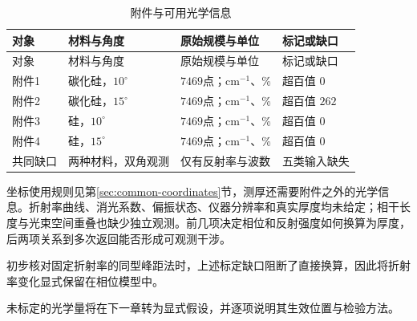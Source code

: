 \begin{longtable}{>{\centering\arraybackslash}p{} >{\centering\arraybackslash}p{} >{\centering\arraybackslash}p{} >{\centering\arraybackslash}p{}}
\caption{附件与可用光学信息}\label{tab:available-info}\\
\hline
对象 & 材料与角度 & 原始规模与单位 & 标记或缺口\\
\hline
\endfirsthead
\hline
对象 & 材料与角度 & 原始规模与单位 & 标记或缺口\\
\hline
\endhead
附件1 & 碳化硅，$10^\circ$ & $7469$点；\(\mathrm{cm}^{-1}\)、\% & 超百值 $0$\\
附件2 & 碳化硅，$15^\circ$ & $7469$点；\(\mathrm{cm}^{-1}\)、\% & 超百值 $262$\\
附件3 & 硅，$10^\circ$ & $7469$点；\(\mathrm{cm}^{-1}\)、\% & 超百值 $0$\\
附件4 & 硅，$15^\circ$ & $7469$点；\(\mathrm{cm}^{-1}\)、\% & 超百值 $0$\\
共同缺口 & 两种材料，双角观测 & 仅有反射率与波数 & 五类输入缺失\\
\hline
\end{longtable}

坐标使用规则见第\ref{sec:common-coordinates}节，测厚还需要附件之外的光学信息。折射率曲线、消光系数、偏振状态、仪器分辨率和真实厚度均未给定；相干长度与光束空间重叠也缺少独立观测。前几项决定相位和反射强度如何换算为厚度，后两项关系到多次返回能否形成可观测干涉。

初步核对固定折射率的同型峰距法时，上述标定缺口阻断了直接换算，因此将折射率变化显式保留在相位模型中。

未标定的光学量将在下一章转为显式假设，并逐项说明其生效位置与检验方法。
